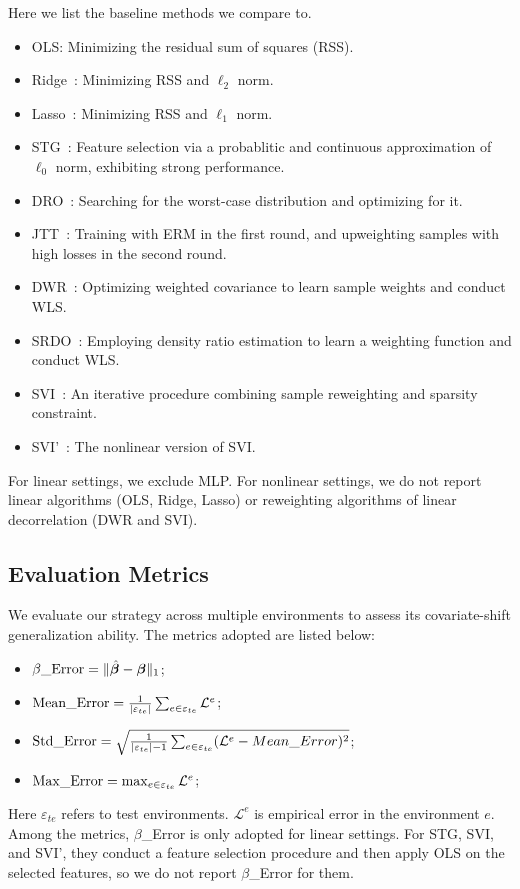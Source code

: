 Here we list the baseline methods we compare to. 
\begin{itemize}
    \item OLS: Minimizing the residual sum of squares (RSS). 
    \item Ridge~\citep{tikhonov1963solution}: Minimizing RSS and $\ell_2$ norm. 
    \item Lasso~\citep{tibshirani1996regression}: Minimizing RSS and $\ell_1$ norm. 
    \item STG~\citep{yamada2020feature}: Feature selection via a probablitic and continuous approximation of $\ell_0$ norm, exhibiting strong performance. 
    \item DRO~\citep{sinha2018certifying}: Searching for the worst-case distribution and optimizing for it. 
    \item JTT~\citep{liu2021just}: Training with ERM in the first round, and upweighting samples with high losses in the second round. 
    \item DWR~\citep{kuang2020stable}: Optimizing weighted covariance to learn sample weights and conduct WLS. 
    \item SRDO~\citep{shen2020stable}: Employing density ratio estimation to learn a weighting function and conduct WLS. 
    \item SVI~\citep{yu2023stable}: An iterative procedure combining sample reweighting and sparsity constraint.  
    \item SVI'~\citep{yu2023stable}: The nonlinear version of SVI. 
\end{itemize}
For linear settings, we exclude MLP. For nonlinear settings, we do not report linear algorithms (OLS, Ridge, Lasso) or reweighting algorithms of linear decorrelation (DWR and SVI). 

\subsection{Evaluation Metrics}

We evaluate our strategy across multiple environments to assess its covariate-shift generalization ability. The metrics adopted are listed below:
\begin{itemize}
    \item $\beta\_{\rm Error}=\|\hat{\boldsymbol{\beta}}-\boldsymbol{\beta}\|_1$; 
    \item ${\rm Mean\_Error} = \frac{1}{|\varepsilon_{te}|}\sum_{e\in \varepsilon_{te}}\mathcal{L}^e$;
    \item ${\rm Std\_Error} = \sqrt{\frac{1}{|\varepsilon_{te}|-1} \sum_{e\in \varepsilon_{te}}(\mathcal{L}^e-Mean\_Error)^2}$;
    \item ${\rm Max\_Error} = \max_{e\in \varepsilon_{te}}\mathcal{L}^e$;
\end{itemize}
Here $\varepsilon_{te}$ refers to test environments. $\mathcal{L}^e$ is empirical error in the environment $e$. 
Among the metrics, $\beta$\_Error is only adopted for linear settings. 
For STG, SVI, and SVI', they conduct a feature selection procedure and then apply OLS on the selected features, so we do not report $\beta$\_Error for them. 





